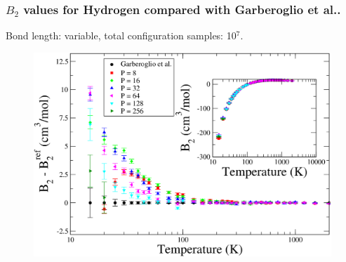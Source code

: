\documentclass[xcolor=svgnames]{beamer}
\begin{document}
            \begin{frame}
                \frametitle{$B_2$ values for Hydrogen compared with Garberoglio et al..}
                \begin{center}Bond length: variable, total configuration samples: 10$^7$.\end{center}
                \begin{figure}
                    \centering
                    \includegraphics[scale=0.18,keepaspectratio]{s3GarberoglioAll.png}
                \end{figure}
            \end{frame}
\end{document}
